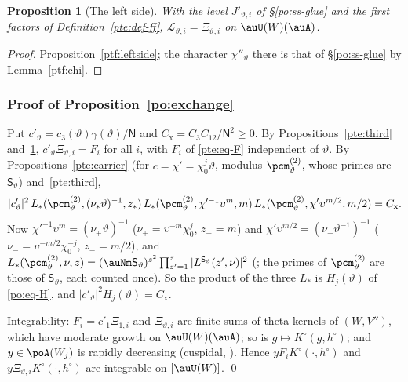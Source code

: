 \documentclass[10pt]{amsart}
\newtheorem{proposition}[theorem]{Proposition}
\theoremstyle{definition}
\theoremstyle{remark}
\begin{document}
\begin{proposition}[The left side]\label{pte:leftside}
With the level $J'_{\vartheta,i}$ of \S\ref{po:ss-glue} and the first factors of Definition~\ref{pte:def-ff},
$\mathcal L_{\vartheta,i}=\Xi_{\vartheta,i}$ on $\auU(W)(\auA)$.
\end{proposition}
\begin{proof}
Proposition~\ref{ptf:leftside}; the character $\chi''_\vartheta$ there is that of \S\ref{po:ss-glue} by Lemma~\ref{ptf:chi}.
\end{proof}

\subsubsection{Proof of Proposition~\ref{po:exchange}}\label{pte:ss-proof}

Put $c'_\vartheta=c_3(\vartheta)\gamma(\vartheta)/\mathsf N$ and $C_{\mathrm x}=C_3C_{12}/\mathsf N^2\ge0$. By
Propositions~\ref{pte:third} and~\ref{pte:leftside}, $c'_\vartheta\Xi_{\vartheta,i}=F_i$ for all $i$, with $F_i$ of
\eqref{pte:eq-F} independent of $\vartheta$. By Propositions~\ref{pte:carrier} (for $c=\chi'=\chi_0^j\vartheta$, modulus
$\pcm^{(2)}_\vartheta$, whose primes are $\mathsf S_\vartheta$) and~\ref{pte:third},
\[
|c'_\vartheta|^2\,L_*(\pcm^{(2)}_\vartheta,(\nu_*\vartheta)^{-1},z_*)\,L_*(\pcm^{(2)}_\vartheta,\chi'^{-1}\upsilon^m,m)\,L_*(\pcm^{(2)}_\vartheta,\chi'\upsilon^{m/2},m/2)
=C_{\mathrm x}.
\]
Now $\chi'^{-1}\upsilon^m=(\nu_+\vartheta)^{-1}$ ($\nu_+=\upsilon^{-m}\chi_0^j$, $z_+=m$) and $\chi'\upsilon^{m/2}=(\nu_-\vartheta^{-1})^{-1}$
($\nu_-=\upsilon^{-m/2}\chi_0^{-j}$, $z_-=m/2$), and $L_*(\pcm^{(2)}_\vartheta,\nu,z)=(\auNm\mathsf S_\vartheta)^{z^2}\prod_{z'=1}^z|L^{\mathsf S_\vartheta}(z',\nu)|^2$
({\cite[(11)]{P53}}; the primes of $\pcm^{(2)}_\vartheta$ are those of $\mathsf S_\vartheta$, each counted once). So the product of the three
$L_*$ is $H_j(\vartheta)$ of \eqref{po:eq-H}, and $|c'_\vartheta|^2H_j(\vartheta)=C_{\mathrm x}$.

Integrability: $F_i=c'_1\Xi_{1,i}$ and $\Xi_{\vartheta,i}$ are finite sums of theta kernels of $(W,V'')$, which have moderate
growth on $\auU(W)(\auA)$; so is $g\mapsto K^\circ(g,h^\circ)$; and $y\in\poA(W_j)$ is rapidly decreasing (cuspidal,
{\cite[\S14.3]{P46}}). Hence $yF_iK^\circ(\cdot,h^\circ)$ and $y\Xi_{\vartheta,i}K^\circ(\cdot,h^\circ)$ are integrable on $[\auU(W)]$.
\qed
\end{document}
